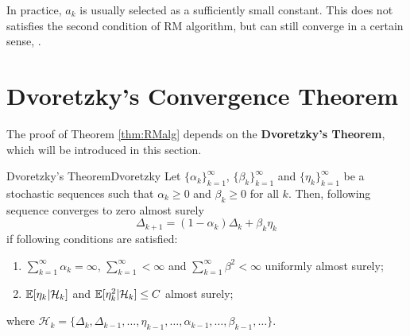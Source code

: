     In practice, $a_k$ is usually selected as a sufficiently small constant. This does not satisfies the second condition of RM algorithm, but can still converge in a certain sense, \cite{Zhao2025}.
\section{Dvoretzky's Convergence Theorem}
    The proof of Theorem \ref{thm:RMalg} depends on the \textbf{Dvoretzky's Theorem}, which will be introduced in this section.
    \begin{thm}{Dvoretzky's Theorem}{Dvoretzky}
        Let $\{\alpha_k\}_{k=1}^\infty$, $\{\beta_k\}_{k=1}^\infty$ and $\{\eta_k\}_{k=1}^\infty$ be a stochastic sequences such that $\alpha_k \geq 0$ and $\beta_k \geq 0$ for all $k$.
        Then, following sequence converges to zero almost surely
        \begin{equation}
            \Delta_{k+1} = (1-\alpha_k)\Delta_k + \beta_k \eta_k
        \end{equation}
        if following conditions are satisfied:
        \begin{enumerate}
            \item $\sum_{k=1}^\infty \alpha_k = \infty$, $\sum_{k=1}^\infty < \infty$ and $\sum_{k=1}^\infty \beta^2 < \infty$ uniformly almost surely;
            \item $\mathbb{E}[\eta_k|\mathcal{H}_k]$ and $\mathbb{E}[\eta_k^2|\mathcal{H}_k] \leq C$ almost surely;
        \end{enumerate}
        where $\mathcal{H}_k=\{\Delta_k, \Delta_{k-1}, \dots, \eta_{k-1},\dots,\alpha_{k-1},\dots,\beta_{k-1},\dots\}$.
    \end{thm}

